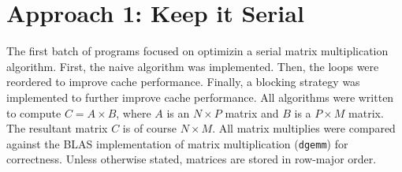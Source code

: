 \documentclass{article}
\begin{document}
\section{Approach 1: Keep it Serial}
The first batch of programs focused on optimizin a serial matrix multiplication algorithm.
First, the naive algorithm was implemented. Then, the loops were reordered to improve cache performance.
Finally, a blocking strategy was implemented to further improve cache performance. All 
algorithms were written to compute $C = A \times B$, where $A$ is an $N \times P$ 
matrix and $B$ is a $P \times M$ matrix. The resultant matrix $C$ is of course $N \times M$. 
All matrix multiplies were compared against the BLAS implementation of matrix multiplication 
(\texttt{dgemm}) for correctness. Unless otherwise stated, matrices are stored in row-major order.
\end{document}

